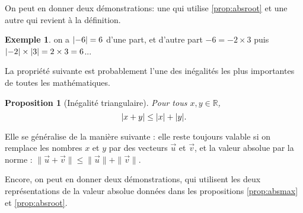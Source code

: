 \documentclass{article}
\theoremstyle{definition}
\newtheorem{exe}[mydef]{Exemple}
\theoremstyle{remark}
\theoremstyle{plain}
\newtheorem{prop}[mydef]{Proposition}
\newcommand{\R}{\mathbb R}
\DeclarePairedDelimiter{\abs}{\lvert}{\rvert}
\begin{document}
On peut en donner deux démonstrations: une qui utilise \ref{prop:absroot} et une autre qui revient à la définition.

\begin{exe}
on a $\abs{-6} = 6$ d'une part, et d'autre part $-6 = -2\times 3$ puis $\abs{-2} \times \abs 3 = 2 \times 3 = 6$...
\end{exe}

La propriété suivante est probablement l'une des inégalités les plus importantes de toutes les mathématiques.

\begin{prop}[Inégalité triangulaire]
Pour tous $x,y\in\R$,
\begin{equation}
\abs{x+y} \leq \abs x + \abs y.
\end{equation}
\end{prop}

Elle se généralise de la manière suivante : elle reste toujours valable si on remplace les nombres $x$ et $y$ par des vecteurs $\vec u$ et $\vec v$, et la valeur absolue par la norme : $\|\vec u+\vec v\|\leq \|\vec u\| + \|\vec v\|$.

Encore, on peut en donner deux démonstrations, qui utilisent les deux représentations de la valeur absolue données dans les propositions \ref{prop:absmax} et \ref{prop:absroot}.
\end{document}
